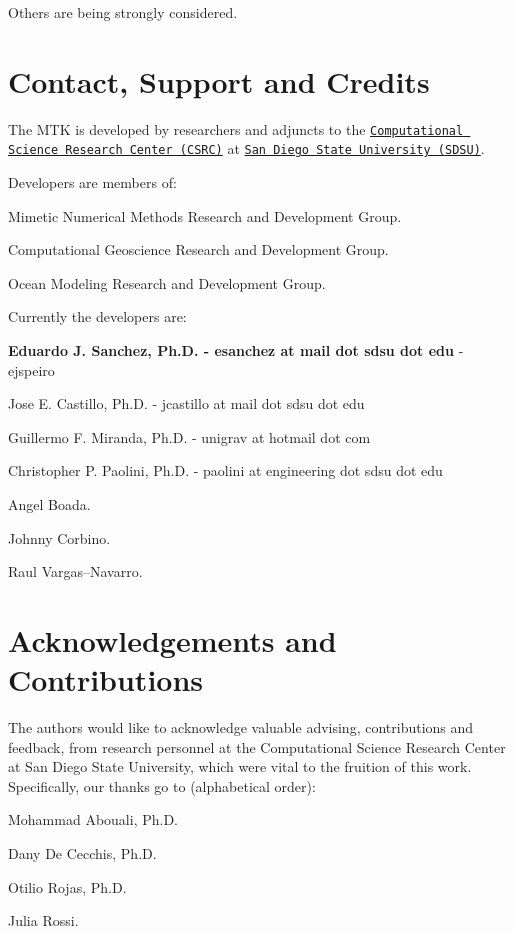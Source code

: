 Others are being strongly considered.\hypertarget{index_section_authors}{}\section{Contact, Support and Credits}\label{index_section_authors}
The M\+T\+K is developed by researchers and adjuncts to the \href{http://www.csrc.sdsu.edu/}{\tt Computational Science Research Center (C\+S\+R\+C)} at \href{http://www.sdsu.edu/}{\tt San Diego State University (S\+D\+S\+U)}.

Developers are members of\+:


\begin{DoxyEnumerate}
\item Mimetic Numerical Methods Research and Development Group.
\item Computational Geoscience Research and Development Group.
\item Ocean Modeling Research and Development Group.
\end{DoxyEnumerate}

Currently the developers are\+:


\begin{DoxyEnumerate}
\item {\bfseries Eduardo J. Sanchez, Ph.\+D. -\/ esanchez at mail dot sdsu dot edu} -\/ ejspeiro
\item Jose E. Castillo, Ph.\+D. -\/ jcastillo at mail dot sdsu dot edu
\item Guillermo F. Miranda, Ph.\+D. -\/ unigrav at hotmail dot com
\item Christopher P. Paolini, Ph.\+D. -\/ paolini at engineering dot sdsu dot edu
\item Angel Boada.
\item Johnny Corbino.
\item Raul Vargas--Navarro.
\end{DoxyEnumerate}\hypertarget{index_subsection_acknowledgements}{}\section{Acknowledgements and Contributions}\label{index_subsection_acknowledgements}
The authors would like to acknowledge valuable advising, contributions and feedback, from research personnel at the Computational Science Research Center at San Diego State University, which were vital to the fruition of this work. Specifically, our thanks go to (alphabetical order)\+:


\begin{DoxyEnumerate}
\item Mohammad Abouali, Ph.\+D.
\item Dany De Cecchis, Ph.\+D.
\item Otilio Rojas, Ph.\+D.
\item Julia Rossi. 
\end{DoxyEnumerate}